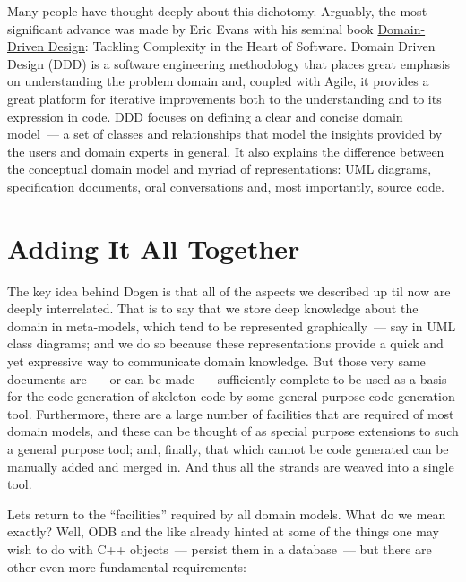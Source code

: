 \documentclass{book}
\begin{document}
Many people have thought deeply about this dichotomy. Arguably, the
most significant advance was made by Eric Evans with his seminal book
\href{http://www.amazon.co.uk/Domain-driven-Design-Tackling-Complexity-Software/dp/0321125215}{Domain-Driven
  Design}: Tackling Complexity in the Heart of
Software\cite{evans2004domain}. Domain Driven Design (DDD) is a
software engineering methodology that places great emphasis on
understanding the problem domain and, coupled with Agile, it provides
a great platform for iterative improvements both to the understanding
and to its expression in code. DDD focuses on defining a clear and
concise domain model~--- a set of classes and relationships that model
the insights provided by the users and domain experts in general. It
also explains the difference between the conceptual domain model and
myriad of representations: UML diagrams, specification documents, oral
conversations and, most importantly, source code.

\section{Adding It All Together}

The key idea behind Dogen is that all of the aspects we described up
til now are deeply interrelated. That is to say that we store deep
knowledge about the domain in meta-models, which tend to be
represented graphically~--- say in UML class diagrams; and we do so
because these representations provide a quick and yet expressive way
to communicate domain knowledge. But those very same documents are~---
or can be made~--- sufficiently complete to be used as a basis for the
code generation of skeleton code by some general purpose code
generation tool. Furthermore, there are a large number of facilities
that are required of most domain models, and these can be thought of
as special purpose extensions to such a general purpose tool; and,
finally, that which cannot be code generated can be manually added and
merged in. And thus all the strands are weaved into a single tool.

Lets return to the ``facilities'' required by all domain models. What
do we mean exactly? Well, ODB and the like already hinted at some of
the things one may wish to do with C++ objects~--- persist them in a
database~--- but there are other even more fundamental requirements:
\end{document}
